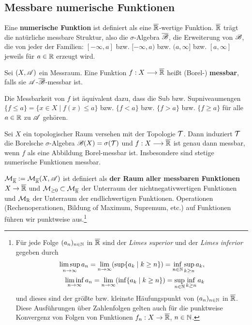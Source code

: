 \subsection{Messbare numerische Funktionen}
Eine \textbf{numerische Funktion} ist definiert als eine $\ol\R$-wertige Funktion. $\ol\R$ trägt die natürliche messbare Struktur, also die $\sigma$-Algebra $\ol\BB$, die Erweiterung von $\BB$, die von jeder der Familien: $[-\infty,a]$ bzw. $[-\infty,a)$ bzw. $(a,\infty]$ bzw. $[a,\infty]$ jeweils für $a\in \R$ erzeugt wird.
\begin{definition}
\begin{mdframed}
Sei $(X,\AA)$ ein Messraum. Eine Funktion $f:X\longrightarrow\ol\R$ heißt (Borel-) \newline \textbf{messbar}, falls sie $\AA$-$\ol\BB$-messbar ist.
\end{mdframed}
\end{definition}
Die Messbarkeit von $f$ ist äquivalent dazu, dass die Sub bzw. Supniveaumengen $\{f\leq a\}= \{x\in X \mid f(x)\leq a \}$ bzw. $\{f<a\}$ bzw. $\{f>a\}$ bzw. $\{f\geq a\}$ für alle $a\in \R$ zu $\AA$ gehören.
\begin{example}
Sei $X$ ein topologischer Raum versehen mit der Topologie $\TT$. Dann induziert $\TT$ die Borelsche $\sigma$-Algebra $\BB(X)=\sigma(\TT)$ und $f:X \longrightarrow \ol\R$ ist genau dann messbar, wenn $f$ als eine Abbildung Borel-messbar ist. Insbesondere sind stetige numerische Funktionen messbar.
\end{example}
$\MM_{\ol\R}:=\MM_{\ol\R}(X,\AA)$ ist definiert als \textbf{der Raum aller messbaren Funktionen} $X \to \ol\R$ und $\MM_{\geq 0} \subset \MM_{\ol\R}$ der Unterraum der nichtnegativwertigen Funktionen und $\MM_{\R}$ der Unterraum der endlichwertigen Funktionen. Operationen (Rechenoperationen, Bildung of Maximum, Supremum, etc.) auf Funktionen führen wir punktweise aus.\footnote{Für jede Folge $(a_n)_{n\in\N}$ in $\ol\R$ sind der \emph{Limes superior} und der \emph{Limes inferior} gegeben durch
\begin{equation*}
\begin{split}
\limsup_{n \to \infty} a_n = \lim_{n\to\infty} (\sup \{a_k \mid k\geq n\})=\inf_{n\in\N}\sup_{k\geq n} a_k, \\
 \liminf_{n\to \infty} a_n = \lim_{n\to \infty}(\inf \{a_k \mid k\geq n\}) = \sup_{n\in\N} \inf_{k \geq n} a_k
\end{split}
\end{equation*}
und dieses sind der größte bzw. kleinste Häufungspunkt von $(a_n)_{n\in\N}$ in $\ol\R$. Diese Ausführungen über Zahlenfolgen gelten auch für die punktweise Konvergenz von Folgen von Funktionen $f_n:X\to \ol\R$, $n\in\N$. 
}

